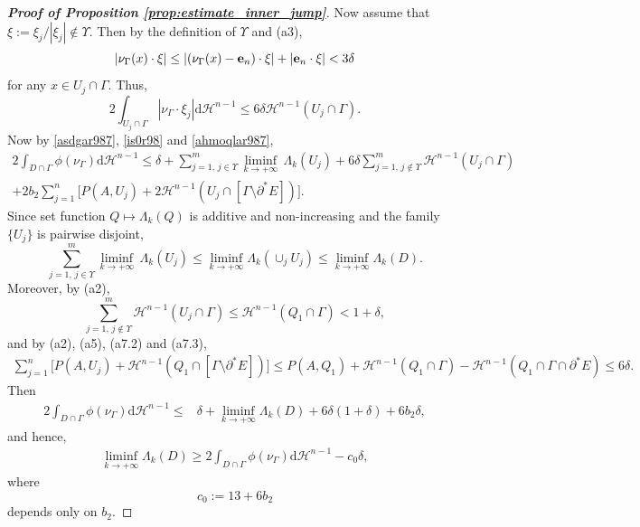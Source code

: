 \documentclass[reqno]{amsart}
\numberwithin{equation}{section}
\theoremstyle{plain}
\theoremstyle{definition}
\newcommand{\cH}{\mathcal{H}}
\newcommand{\p}{\partial}
\newcommand{\bound}{b}
\renewcommand{\d}{\mathrm{d}}
\newcommand{\e}{{\bf e}}
\begin{document}
\begin{proof}[\textbf{Proof of Proposition \ref{prop:estimate_inner_jump}}]
Now assume that $\xi:=\xi_j/|\xi_j|\notin\Upsilon.$ Then by the definition of $\Upsilon$ and (a3),
$$
|\nu_\Gamma(x)\cdot\xi| \le |(\nu_\Gamma(x) - \e_n)\cdot\xi| + |\e_n\cdot\xi| <3\delta  
$$
for any $x\in U_j\cap \Gamma.$ Thus,
\begin{equation}\label{ahmoqlar987}
2\int_{U_j\cap \Gamma} |\nu_{\Gamma}\cdot \xi_j| \d\cH^{n-1} \le 6\delta  \cH^{n-1}(U_j\cap\Gamma). 
\end{equation}
Now by \eqref{asdgar987}, \eqref{is0r98} and \eqref{ahmoqlar987},
\begin{multline*}
2\int_{D\cap \Gamma} \phi(\nu_{\Gamma}) \d\cH^{n-1}  \le  \delta  +
\sum\limits_{j=1,\,j\in \Upsilon}^m \liminf\limits_{k\to+\infty}\,\Lambda_k(U_j) + 
6\delta  \sum\limits_{j=1,\,j\notin\Upsilon}^m \cH^{n-1}(U_j\cap\Gamma) \\
 + 2\bound_2\sum\limits_{j=1}^n \Big[P(A,U_j)+2\cH^{n-1}(U_j \cap [\Gamma\setminus \p^*E])\Big].
\end{multline*}
Since set function $Q\mapsto \Lambda_k(Q)$ is additive and non-increasing and the family $\{U_j\}$ is pairwise disjoint,
$$
\sum\limits_{j=1,\,j\in \Upsilon}^m \liminf\limits_{k\to+\infty}\,\Lambda_k(U_j) \le \liminf\limits_{k\to+\infty} 
\Lambda_k(\cup_j U_j) \le \liminf\limits_{k\to+\infty} 
\Lambda_k(D).
$$
Moreover, by (a2),
$$
\sum\limits_{j=1,\,j\notin\Upsilon}^m \cH^{n-1}(U_j\cap\Gamma) \le \cH^{n-1}(Q_1\cap \Gamma) <1+\delta , 
$$
and by (a2), (a5), (a7.2)  and (a7.3),
\begin{align*}
\sum\limits_{j=1}^n \Big[ P(A,U_j)+\cH^{n-1}(Q_1 \cap [\Gamma\setminus \p^*E]) \Big]
\le 
P(A,Q_1) + \cH^{n-1}(Q_1 \cap \Gamma) - \cH^{n-1}(Q_1\cap \Gamma\cap\p^*E)
\le 6\delta.
\end{align*}
Then
\begin{align*}
2\int_{D\cap \Gamma} \phi(\nu_{\Gamma}) \d\cH^{n-1}  \le & \delta  +  \liminf\limits_{k\to+\infty} 
\Lambda_k(D) + 6\delta (1+\delta ) + 6\bound_2\delta, 
\end{align*}
and hence,
\begin{align}\label{Step1122}
\liminf\limits_{k\to+\infty} 
\Lambda_k(D) \ge 2\int_{D\cap \Gamma} \phi(\nu_{\Gamma}) \d\cH^{n-1} - c_0\delta , 
\end{align}
where 
$$
c_0:=13+  6\bound_2
$$
depends only on $\bound_2.$
 

\end{proof}
\end{document}
